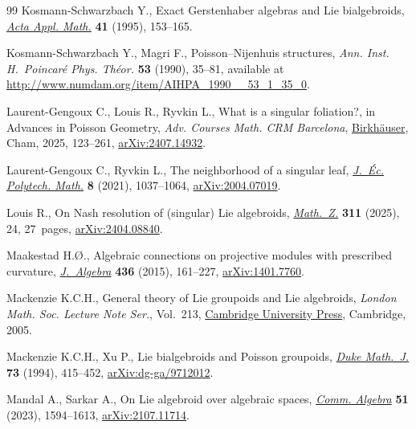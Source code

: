 \documentclass[pdftex]{sigma}
\numberwithin{equation}{section}
\theoremstyle{definition}
\begin{document}
\begin{thebibliography}{99}
Kosmann-Schwarzbach Y., Exact {G}erstenhaber algebras and {L}ie bialgebroids,
 \href{https://doi.org/10.1007/BF00996111}{\textit{Acta Appl. Math.}}
 \textbf{41} (1995), 153--165.

Kosmann-Schwarzbach Y., Magri F., Poisson--{N}ijenhuis structures, \textit{Ann.
 Inst. H.~Poincar\'e Phys. Th\'eor.} \textbf{53} (1990), 35--81, available at \url{http://www.numdam.org/item/AIHPA_1990__53_1_35_0}.

Laurent-Gengoux C., Louis R., Ryvkin L., What is a singular foliation?, in
 Advances in {P}oisson Geometry, \textit{Adv. Courses Math. CRM Barcelona},
 \href{https://doi.org/10.1007/978-3-031-86657-9_3}{Birkh\"auser}, Cham,
 2025, 123--261, \href{http://arxiv.org/abs/2407.14932}{arXiv:2407.14932}.

Laurent-Gengoux C., Ryvkin L., The neighborhood of a singular leaf,
 \href{https://doi.org/10.5802/jep.165}{\textit{J.~\'Ec. Polytech. Math.}}
 \textbf{8} (2021), 1037--1064,
 \href{http://arxiv.org/abs/2004.07019}{arXiv:2004.07019}.

Louis R., On {N}ash resolution of (singular) {L}ie algebroids,
 \href{https://doi.org/10.1007/s00209-025-03817-4}{\textit{Math.~Z.}}
 \textbf{311} (2025), 24, 27~pages,
 \href{http://arxiv.org/abs/2404.08840}{arXiv:2404.08840}.

Maakestad H.{\O}., Algebraic connections on projective modules with prescribed
 curvature,
 \href{https://doi.org/10.1016/j.jalgebra.2015.03.024}{\textit{J.~Algebra}}
 \textbf{436} (2015), 161--227,
 \href{http://arxiv.org/abs/1401.7760}{arXiv:1401.7760}.

Mackenzie K.C.H., General theory of {L}ie groupoids and {L}ie algebroids,
 \textit{London Math. Soc. Lecture Note Ser.}, Vol.~213,
 \href{https://doi.org/10.1017/CBO9781107325883}{Cambridge University Press},
 Cambridge, 2005.

Mackenzie K.C.H., Xu P., Lie bialgebroids and {P}oisson groupoids,
 \href{https://doi.org/10.1215/S0012-7094-94-07318-3}{\textit{Duke Math.~J.}}
 \textbf{73} (1994), 415--452,
 \href{http://arxiv.org/abs/dg-ga/9712012}{arXiv:dg-ga/9712012}.

Mandal A., Sarkar A., On {L}ie algebroid over algebraic spaces,
 \href{https://doi.org/10.1080/00927872.2022.2139971}{\textit{Comm. Algebra}}
 \textbf{51} (2023), 1594--1613,
 \href{http://arxiv.org/abs/2107.11714}{arXiv:2107.11714}.


\end{thebibliography}
\end{document}
